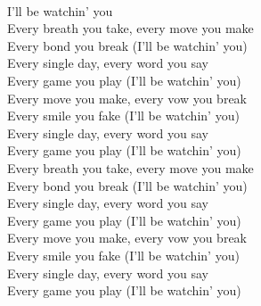 \\
I'll be watchin' you \\
Every breath you take, every move you make \\
Every bond you break (I'll be watchin' you) \\
Every single day, every word you say \\
Every game you play (I'll be watchin' you) \\
Every move you make, every vow you break \\
Every smile you fake (I'll be watchin' you) \\
Every single day, every word you say \\
Every game you play (I'll be watchin' you) \\
Every breath you take, every move you make \\
Every bond you break (I'll be watchin' you) \\
Every single day, every word you say \\
Every game you play (I'll be watchin' you) \\
Every move you make, every vow you break \\
Every smile you fake (I'll be watchin' you) \\
Every single day, every word you say \\
Every game you play (I'll be watchin' you) \\
